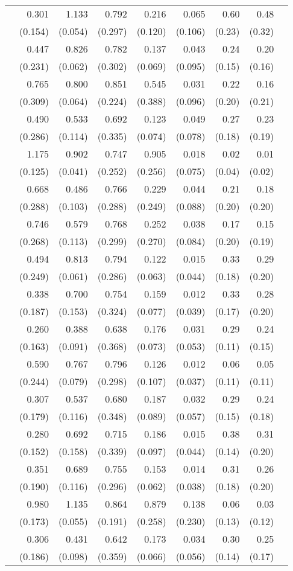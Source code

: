 \begin{longtable}{rrrrrrrrr}
\addlinespace[0.05cm] 64&0.301&1.133&0.792&0.216&0.065&0.60&0.48\\&(0.154)&(0.054)&(0.297)&(0.120)&(0.106)&(0.23)&(0.32) \\ \addlinespace[0.05cm] 65&0.447&0.826&0.782&0.137&0.043&0.24&0.20\\&(0.231)&(0.062)&(0.302)&(0.069)&(0.095)&(0.15)&(0.16) \\ \addlinespace[0.05cm] 66&0.765&0.800&0.851&0.545&0.031&0.22&0.16\\&(0.309)&(0.064)&(0.224)&(0.388)&(0.096)&(0.20)&(0.21) \\ \addlinespace[0.05cm] 67&0.490&0.533&0.692&0.123&0.049&0.27&0.23\\&(0.286)&(0.114)&(0.335)&(0.074)&(0.078)&(0.18)&(0.19) \\ \addlinespace[0.05cm] 68&1.175&0.902&0.747&0.905&0.018&0.02&0.01\\&(0.125)&(0.041)&(0.252)&(0.256)&(0.075)&(0.04)&(0.02) \\ \addlinespace[0.05cm] 69&0.668&0.486&0.766&0.229&0.044&0.21&0.18\\&(0.288)&(0.103)&(0.288)&(0.249)&(0.088)&(0.20)&(0.20) \\ \addlinespace[0.05cm] 70&0.746&0.579&0.768&0.252&0.038&0.17&0.15\\&(0.268)&(0.113)&(0.299)&(0.270)&(0.084)&(0.20)&(0.19) \\ \addlinespace[0.05cm] 71&0.494&0.813&0.794&0.122&0.015&0.33&0.29\\&(0.249)&(0.061)&(0.286)&(0.063)&(0.044)&(0.18)&(0.20) \\ \addlinespace[0.05cm] 72&0.338&0.700&0.754&0.159&0.012&0.33&0.28\\&(0.187)&(0.153)&(0.324)&(0.077)&(0.039)&(0.17)&(0.20) \\ \addlinespace[0.05cm] 73&0.260&0.388&0.638&0.176&0.031&0.29&0.24\\&(0.163)&(0.091)&(0.368)&(0.073)&(0.053)&(0.11)&(0.15) \\ \addlinespace[0.05cm] 74&0.590&0.767&0.796&0.126&0.012&0.06&0.05\\&(0.244)&(0.079)&(0.298)&(0.107)&(0.037)&(0.11)&(0.11) \\ \addlinespace[0.05cm] 75&0.307&0.537&0.680&0.187&0.032&0.29&0.24\\&(0.179)&(0.116)&(0.348)&(0.089)&(0.057)&(0.15)&(0.18) \\ \addlinespace[0.05cm] 76&0.280&0.692&0.715&0.186&0.015&0.38&0.31\\&(0.152)&(0.158)&(0.339)&(0.097)&(0.044)&(0.14)&(0.20) \\ \addlinespace[0.05cm] 77&0.351&0.689&0.755&0.153&0.014&0.31&0.26\\&(0.190)&(0.116)&(0.296)&(0.062)&(0.038)&(0.18)&(0.20) \\ \addlinespace[0.05cm] 78&0.980&1.135&0.864&0.879&0.138&0.06&0.03\\&(0.173)&(0.055)&(0.191)&(0.258)&(0.230)&(0.13)&(0.12) \\ \addlinespace[0.05cm] 79&0.306&0.431&0.642&0.173&0.034&0.30&0.25\\&(0.186)&(0.098)&(0.359)&(0.066)&(0.056)&(0.14)&(0.17) \\ 
\end{longtable}
